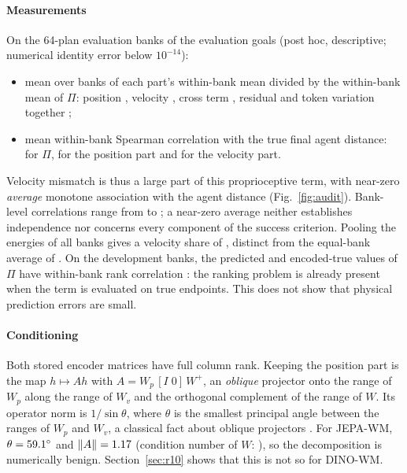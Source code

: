 \paragraph{Measurements} On the 64-plan evaluation banks of the \REightN{} evaluation goals (post hoc, descriptive;
numerical identity error below $10^{-14}$):
\begin{itemize}[leftmargin=*,itemsep=1pt]
\item mean over banks of each part's within-bank mean divided by the within-bank mean of $\Pi$: position \DecJPos,
  velocity \DecJVel, cross term \DecJCross, residual and token variation together \DecJResTok;
\item mean within-bank Spearman correlation with the true final agent distance: \DecJSpFull{} for $\Pi$, \DecJSpPos{}
  for the position part and \DecJSpVel{} for the velocity part.
\end{itemize}
Velocity mismatch is thus a large part of this proprioceptive term, with near-zero \emph{average} monotone association
with the agent distance (Fig.~\ref{fig:audit}). Bank-level correlations range from \DecJSpVelMin{} to \DecJSpVelMax{};
a near-zero average neither establishes independence nor concerns every component of the success criterion. Pooling
the energies of all banks gives a velocity share of \DecJVelPooled{}, distinct from the equal-bank average of
\DecJVel. On the development banks, the predicted and encoded-true values of $\Pi$ have within-bank rank correlation
\DevSpPredTrue: the ranking problem is already present when the term is evaluated on true endpoints. This does not
show that physical prediction errors are small.

\paragraph{Conditioning} Both stored encoder matrices have full column rank. Keeping the position part is the map $h\mapsto Ah$ with $A=W_p\,[I\;0]\,W^{+}$, an
\emph{oblique} projector onto the range of $W_p$ along the range of $W_v$ and the orthogonal complement of the range of
$W$. Its operator norm is $1/\sin\theta$, where $\theta$ is the smallest principal angle between the ranges of $W_p$ and
$W_v$, a classical fact about oblique projectors \cite{simoncini2010oblique}. For JEPA-WM, $\theta=59.1^\circ$ and $\|A\|=1.17$ (condition number of $W$: \CondJ), so the
decomposition is numerically benign. Section~\ref{sec:r10} shows that this is not so for DINO-WM.

